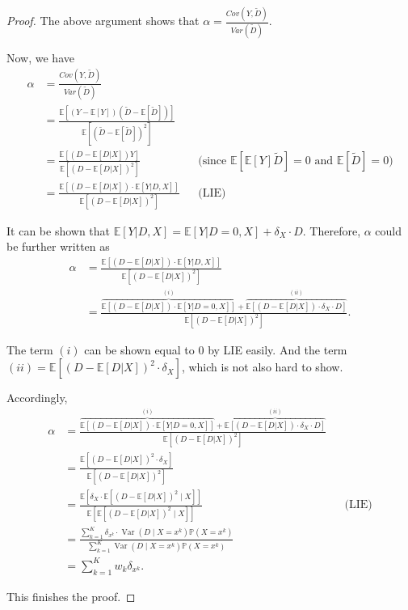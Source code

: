 \documentclass[11pt,a4paper]{amsart}
\theoremstyle{plain}
\theoremstyle{definition}
\begin{document}
\begin{proof}
		The above argument shows that $\alpha = \frac{Cov(Y,\tilde{D})}{Var(\tilde{D})}$.\par
		Now, we have
		\[	\begin{aligned}
			\alpha &= \frac{Cov(Y,\tilde{D})}{Var(\tilde{D})} \\
			&= \frac{\mathbb{E}\left[(Y-\mathbb{E}[Y])(\tilde{D}-\mathbb{E}[\tilde{D}])\right]}{\mathbb{E}\left[(\tilde{D}-\mathbb{E}[\tilde{D}])^{2}\right]} \\
			&= \frac{\mathbb{E}\left[(D-\mathbb{E}[D|X])Y\right]}{\mathbb{E}\left[(D-\mathbb{E}[D|X])^{2}\right]} &&\text{(since $\mathbb{E}\left[\mathbb{E}[Y]\tilde{D}\right]=0$ and $\mathbb{E}[\tilde{D}] = 0$)} \\
			&= \frac{\mathbb{E}\left[(D-\mathbb{E}[D|X])\cdot\mathbb{E}\left[Y|D,X\right]\right]}{\mathbb{E}\left[(D-\mathbb{E}[D|X])^{2}\right]} &&\text{(LIE)}
		\end{aligned}	\] 
		
		It can be shown that $\mathbb{E}\left[Y|D,X\right] = \mathbb{E}\left[Y | D=0, X\right] + \delta_{X} \cdot D$. Therefore, $\alpha$ could be further written as 
		\[	\begin{aligned}
				\alpha &= \frac{\mathbb{E}\left[(D-\mathbb{E}[D|X])\cdot\mathbb{E}\left[Y|D,X\right]\right]}{\mathbb{E}\left[(D-\mathbb{E}[D|X])^{2}\right]}  \\
				&= \frac{\overbrace{\mathbb{E}\left[(D-\mathbb{E}[D|X])\cdot\mathbb{E}\left[Y|D=0,X\right]\right]}^{(i)} + \overbrace{\mathbb{E}\left[(D-\mathbb{E}[D|X])\cdot\delta_{X} \cdot D\right]}^{(ii)}}{\mathbb{E}\left[(D-\mathbb{E}[D|X])^{2}\right]}.
		\end{aligned} \]
		
		The term $(i)$ can be shown equal to $0$ by LIE easily. And the term $(ii) = \mathbb{E}\left[(D-\mathbb{E}[D|X])^{2}\cdot\delta_{X}\right]$, which is not also hard to show.\par 
		Accordingly, 
		\[	\begin{aligned}
			\alpha &= \frac{\overbrace{\mathbb{E}\left[(D-\mathbb{E}[D|X])\cdot\mathbb{E}\left[Y|D=0,X\right]\right]}^{(i)} + \overbrace{\mathbb{E}\left[(D-\mathbb{E}[D|X])\cdot\delta_{X} \cdot D\right]}^{(ii)}}{\mathbb{E}\left[(D-\mathbb{E}[D|X])^{2}\right]} \\
			&= \frac{\mathbb{E}\left[(D-\mathbb{E}[D|X])^{2}\cdot\delta_{X}\right]}{\mathbb{E}\left[(D-\mathbb{E}[D|X])^{2}\right]} \\
			&= \frac{\mathbb{E}\left[\delta_{X}\cdot \mathbb{E}[(D-\mathbb{E}[D|X])^{2} \mid X]\right]}{\mathbb{E}\left[\mathbb{E}[(D-\mathbb{E}[D|X])^{2} \mid X]\right]} &&\text{(LIE)} \\
			&=  \frac{\sum_{k=1}^{K} \delta_{x^{k}} \cdot \operatorname{Var}\left(D \mid X= x^{k}\right) \mathbb{P}\left(X=x^{k}\right)}{\sum_{k=1}^{K} \operatorname{Var}\left(D \mid X= x^{k}\right) \mathbb{P}\left(X=x^{k}\right)} \\
			&= \sum_{k=1}^{K} w_{k} \delta_{x^{k}}.
		\end{aligned}	\]
		
		This finishes the proof.
	\end{proof}
\end{document}
